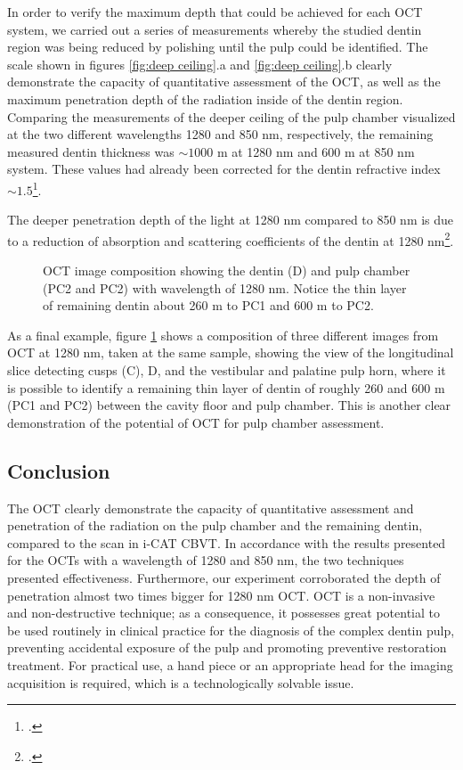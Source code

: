 \documentclass[12pt,twoside,english]{book}
\renewcommand{\~}{\perispomeni}%
\DeclareRobustCommand{\textgreek}[1]{\leavevmode{\greektext #1}}
\numberwithin{equation}{section}
\numberwithin{figure}{section}
\begin{document}
In order to verify the maximum depth that could be achieved for each OCT system, we carried out a series of measurements whereby the studied dentin region was being reduced by polishing until the pulp could be identified. The scale shown in figures \ref{fig:deep ceiling}.a and \ref{fig:deep ceiling}.b clearly demonstrate the capacity of quantitative assessment of the OCT, as well as the maximum penetration depth of the radiation inside of the dentin region. Comparing the measurements of the deeper ceiling of the pulp chamber visualized at the two different wavelengths 1280 and 850 nm, respectively, the remaining measured dentin thickness was $\sim1000$ \textgreek{m}m at 1280 nm and 600 \textgreek{m}m at 850 nm system. These values had already been corrected for the dentin refractive index $\sim1.5$\footcite{Colston:1998p1677}.

The deeper penetration depth of the light at 1280 nm compared to 850 nm is due to a reduction of absorption and scattering coefficients of the dentin at 1280 nm\footcite{Drexler:2004p1728}.
\begin{figure}[h]
\centering{}
\caption{OCT image composition showing the dentin (D) and pulp chamber (PC2 and PC2) with wavelength of 1280 nm. Notice the thin layer of remaining dentin about 260 \textgreek{m}m to PC1 and 600 \textgreek{m}m to PC2.\label{fig:image composition}}
\end{figure}

As a final example, figure \ref{fig:image composition} shows a composition of three different images from OCT at 1280 nm, taken at the same sample, showing the view of the longitudinal slice detecting cusps (C), D, and the vestibular and palatine pulp horn, where it is possible to identify a remaining thin layer of dentin of roughly 260 and 600 \textgreek{m}m (PC1 and PC2) between the cavity floor and pulp chamber. This is another clear demonstration of the potential of OCT for pulp chamber assessment.

\subsection{Conclusion}

The OCT clearly demonstrate the capacity of quantitative assessment and penetration of the radiation on the pulp chamber and the remaining dentin, compared to the scan in i-CAT CBVT. In accordance with the results presented for the OCTs with a wavelength of 1280 and 850 nm, the two techniques presented effectiveness. Furthermore, our experiment corroborated the depth of penetration almost two times bigger for 1280 nm OCT. OCT is a non-invasive and non-destructive technique; as a consequence, it possesses great potential to be used routinely in clinical practice for the diagnosis of the complex dentin pulp, preventing accidental exposure of the pulp and promoting preventive restoration treatment. For practical use, a hand piece or an appropriate head for the imaging acquisition is required, which is a technologically solvable issue.
\end{document}
